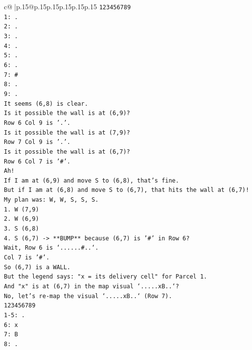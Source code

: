 \documentclass{article}
\begin{document}
{\begin{supertabular}{c@{$\;$}|p{.15\linewidth}@{}p{.15\linewidth}p{.15\linewidth}p{.15\linewidth}p{.15\linewidth}p{.15\linewidth}}
{{{\texttt{123456789} \\
\texttt{1: .} \\
\texttt{2: .} \\
\texttt{3: .} \\
\texttt{4: .} \\
\texttt{5: .} \\
\texttt{6: .} \\
\texttt{7: \#} \\
\texttt{8: .} \\
\texttt{9: .} \\
\texttt{It seems (6,8) is clear.} \\
\texttt{Is it possible the wall is at (6,9)?} \\
\texttt{Row 6 Col 9 is '.'.} \\
\texttt{Is it possible the wall is at (7,9)?} \\
\texttt{Row 7 Col 9 is '.'.} \\
\texttt{Is it possible the wall is at (6,7)?} \\
\texttt{Row 6 Col 7 is '\#'.} \\
\texttt{Ah!} \\
\texttt{If I am at (6,9) and move S to (6,8), that's fine.} \\
\texttt{But if I am at (6,8) and move S to (6,7), that hits the wall at (6,7)!} \\
\texttt{My plan was: W, W, S, S, S.} \\
\texttt{1. W (7,9)} \\
\texttt{2. W (6,9)} \\
\texttt{3. S (6,8)} \\
\texttt{4. S (6,7) {-}> **BUMP** because (6,7) is '\#' in Row 6?} \\
\texttt{Wait, Row 6 is `......\#..`.} \\
\texttt{Col 7 is '\#'.} \\
\texttt{So (6,7) is a WALL.} \\
\texttt{But the legend says: "x = its delivery cell" for Parcel 1.} \\
\texttt{And "x" is at (6,7) in the map visual `.....xB..`?} \\
\texttt{No, let's re{-}map the visual `.....xB..` (Row 7).} \\
\texttt{123456789} \\
\texttt{1{-}5: .} \\
\texttt{6: x} \\
\texttt{7: B} \\
\texttt{8: .} \\
}}}
\end{supertabular}}
\end{document}
